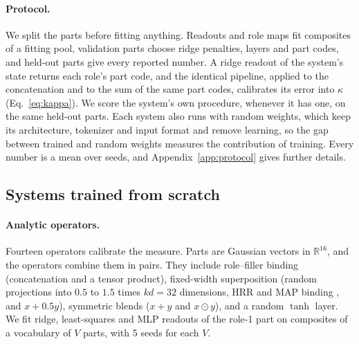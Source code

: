 \documentclass[10pt]{article}
\theoremstyle{plain}
\theoremstyle{remark}
\newcommand{\R}{\mathbb{R}}
\begin{document}
\paragraph{Protocol.} We split the parts before fitting anything. Readouts and role maps fit composites of a fitting pool, validation parts choose ridge penalties, layers and part codes, and held-out parts give every reported number. A ridge readout of the system's state returns each role's part code, and the identical pipeline, applied to the concatenation and to the sum of the same part codes, calibrates its error into $\kappa$ (Eq.~\ref{eq:kappa}). We score the system's own procedure, whenever it has one, on the same held-out parts. Each system also runs with random weights, which keep its architecture, tokenizer and input format and remove learning, so the gap between trained and random weights measures the contribution of training. Every number is a mean over seeds, and Appendix~\ref{app:protocol} gives further details.

\subsection{Systems trained from scratch}
\label{sec:design_scratch}

\paragraph{Analytic operators.} Fourteen operators calibrate the measure. Parts are Gaussian vectors in $\R^{16}$, and the operators combine them in pairs. They include role--filler binding (concatenation and a tensor product), fixed-width superposition (random projections into $0.5$ to $1.5$ times $kd = 32$ dimensions, HRR and MAP binding \citep{plate1995,gayler2006,kanerva2009}, and $x + 0.5y$), symmetric blends ($x + y$ and $x \odot y$), and a random $\tanh$ layer. We fit ridge, least-squares and MLP readouts of the role-1 part on composites of a vocabulary of $V$ parts, with 5 seeds for each $V$.
\end{document}
